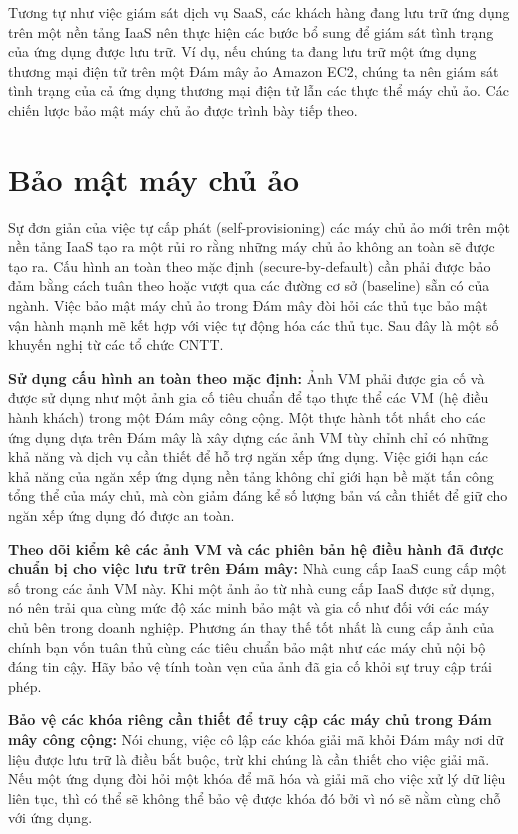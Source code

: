 Tương tự như việc giám sát dịch vụ SaaS, các khách hàng đang lưu trữ ứng dụng trên một nền tảng IaaS nên thực hiện các bước bổ sung để giám sát tình trạng của ứng dụng được lưu trữ. Ví dụ, nếu chúng ta đang lưu trữ một ứng dụng thương mại điện tử trên một Đám mây ảo Amazon EC2, chúng ta nên giám sát tình trạng của cả ứng dụng thương mại điện tử lẫn các thực thể máy chủ ảo. Các chiến lược bảo mật máy chủ ảo được trình bày tiếp theo.

\section{Bảo mật máy chủ ảo}

Sự đơn giản của việc tự cấp phát (self-provisioning) các máy chủ ảo mới trên một nền tảng IaaS tạo ra một rủi ro rằng những máy chủ ảo không an toàn sẽ được tạo ra. Cấu hình an toàn theo mặc định (secure-by-default) cần phải được bảo đảm bằng cách tuân theo hoặc vượt qua các đường cơ sở (baseline) sẵn có của ngành. Việc bảo mật máy chủ ảo trong Đám mây đòi hỏi các thủ tục bảo mật vận hành mạnh mẽ kết hợp với việc tự động hóa các thủ tục. Sau đây là một số khuyến nghị từ các tổ chức CNTT.

\textbf{Sử dụng cấu hình an toàn theo mặc định:} Ảnh VM phải được gia cố và được sử dụng như một ảnh gia cố tiêu chuẩn để tạo thực thể các VM (hệ điều hành khách) trong một Đám mây công cộng. Một thực hành tốt nhất cho các ứng dụng dựa trên Đám mây là xây dựng các ảnh VM tùy chỉnh chỉ có những khả năng và dịch vụ cần thiết để hỗ trợ ngăn xếp ứng dụng. Việc giới hạn các khả năng của ngăn xếp ứng dụng nền tảng không chỉ giới hạn bề mặt tấn công tổng thể của máy chủ, mà còn giảm đáng kể số lượng bản vá cần thiết để giữ cho ngăn xếp ứng dụng đó được an toàn.

\textbf{Theo dõi kiểm kê các ảnh VM và các phiên bản hệ điều hành đã được chuẩn bị cho việc lưu trữ trên Đám mây:} Nhà cung cấp IaaS cung cấp một số trong các ảnh VM này. Khi một ảnh ảo từ nhà cung cấp IaaS được sử dụng, nó nên trải qua cùng mức độ xác minh bảo mật và gia cố như đối với các máy chủ bên trong doanh nghiệp. Phương án thay thế tốt nhất là cung cấp ảnh của chính bạn vốn tuân thủ cùng các tiêu chuẩn bảo mật như các máy chủ nội bộ đáng tin cậy. Hãy bảo vệ tính toàn vẹn của ảnh đã gia cố khỏi sự truy cập trái phép.

\textbf{Bảo vệ các khóa riêng cần thiết để truy cập các máy chủ trong Đám mây công cộng:} Nói chung, việc cô lập các khóa giải mã khỏi Đám mây nơi dữ liệu được lưu trữ là điều bắt buộc, trừ khi chúng là cần thiết cho việc giải mã. Nếu một ứng dụng đòi hỏi một khóa để mã hóa và giải mã cho việc xử lý dữ liệu liên tục, thì có thể sẽ không thể bảo vệ được khóa đó bởi vì nó sẽ nằm cùng chỗ với ứng dụng.

